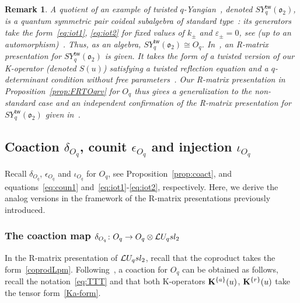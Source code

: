 \documentclass[11pt]{amsart}
\numberwithin{equation}{section}
\newtheorem{rem}[thm]{Remark}
\numberwithin{equation}{section}
\begin{document}
\begin{rem}\label{rem:qtwist} 
A quotient of an example of twisted $q$-Yangian~\cite{MRS02}, denoted $SY^{\textsf{tw}}_q(\mathfrak{o}_2)$, is a quantum symmetric pair coideal subalgebra of standard type~\cite[Sec.\,11.2]{Ko12}: its generators take the form~\eqref{eq:iot1}, \eqref{eq:iot2} for fixed values of $k_\pm$ and $\varepsilon_\pm=0$, see (up to an automorphism)~\cite[Eqs.\,(11.11),~(11.12)]{Ko12}. Thus, as an algebra, $SY^{\textsf{tw}}_q(\mathfrak{o}_2) \cong O_q$. In~\cite[Sec.\,5.1]{Lu23}, an R-matrix presentation for $SY^{\textsf{tw}}_q(\mathfrak{o}_2)$ is given.
It takes the form of a twisted version of our K-operator (denoted $S(u)$) satisfying a twisted reflection equation  \cite[Def.\,2.4]{Lu23} and a $q$-determinant condition without free parameters~\cite[Lem.\,4.6]{Lu23}. Our R-matrix presentation in Proposition~\ref{prop:FRTOqrv}  for $O_q$ thus gives a generalization to the non-standard case and an independent confirmation of the R-matrix presentation for $SY^{\textsf{tw}}_q(\mathfrak{o}_2)$ given in~\cite{Lu23}.
\end{rem}





\subsection{Coaction $\delta_{O_q}$, counit $\epsilon_{O_q}$ and injection $\iota_{O_q}$}\label{sec:delcoun}
Recall $\delta_{O_q}$,  $\epsilon_{O_q}$ and  $\iota_{O_q}$ for $O_q$, see Proposition~\ref{prop:coact}, and equations~\eqref{eq:coun1} and~\eqref{eq:iot1}-\eqref{eq:iot2}, respectively. Here, we derive the analog versions in the framework of the R-matrix presentations previously introduced.

\subsubsection{The coaction map $\delta_{O_q}\colon O_q \rightarrow O_q \otimes \mathcal{L} U_q sl_2$}
In the R-matrix presentation of $\mathcal{L} U_q sl_2$, recall that the coproduct takes the form~\eqref{coprodLpm}.
Following~\cite[Sec.\,6.2]{LBG}, a coaction for $O_q$ can be obtained as follows, recall the notation~\eqref{eq:TTT} and that both K-operators ${\bold K}^{\{a\}}(u)$, ${\bold K}^{\{r\}}(u)$ take the tensor form~\eqref{Ka-form}.
\end{document}
